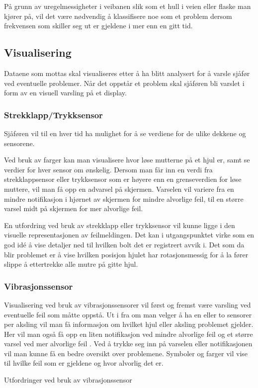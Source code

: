 På grunn av uregelmessigheter i veibanen slik som et hull i veien eller flaske 
man kjører på, vil det være nødvendig å klassifisere noe som et problem dersom 
frekvensen som skiller seg ut er gjeldene i mer enn en gitt tid.

\subsection{Visualisering}
Dataene som mottas skal visualiseres etter å ha blitt analysert for å varsle 
sjåfør ved eventuelle problemer. Når det oppstår et problem skal sjåføren bli 
varslet i form av en visuell varsling på et display.

\subsubsection{Strekklapp/Trykksensor}
Sjåføren vil til en hver tid ha mulighet for å se verdiene for de ulike dekkene 
og sensorene. 

Ved bruk av farger kan man visualisere hvor løse mutterne på et hjul er, samt se 
verdier for hver sensor om ønskelig. Dersom man får inn en verdi fra 
strekklappsensor eller trykksensor som er høyere enn en grenseverdien for løse 
muttere, vil man få opp en advarsel på skjermen. Varselen vil variere fra en 
mindre notifikasjon i hjørnet av skjermen for mindre alvorlige feil, til en 
større varsel midt på skjermen for mer alvorlige feil.

En utfordring ved bruk av strekklapp eller trykksensor vil kunne ligge i den 
visuelle representasjonen av feilmeldingen. Det kan i utgangspunktet virke som 
en god idé å vise detaljer ned til hvilken bolt det er registrert avvik i. Det 
som da blir problemet er å vise hvilken posisjon hjulet har rotasjonsmessig for 
å la fører slippe å ettertrekke alle mutre på gitte hjul.

\subsubsection{Vibrasjonssensor}
Visualisering ved bruk av vibrasjonssensorer vil først og fremst være varsling 
ved eventuelle feil som måtte oppstå. Ut i fra om man velger å ha en eller to 
sensorer per aksling vil man få informasjon om hvilket hjul eller aksling 
problemet gjelder. Her vil man også få opp en liten notifikasjon ved mindre 
alvorlige feil og et større varsel ved mer alvorlige feil . Ved å trykke seg 
inn på varselen eller notifikasjonen vil man kunne få en bedre oversikt over 
problemene. Symboler og farger vil vise til hvilke feil som er gjeldene og hvor 
alvorlig det er.

Utfordringer ved bruk av vibrasjonssensor %